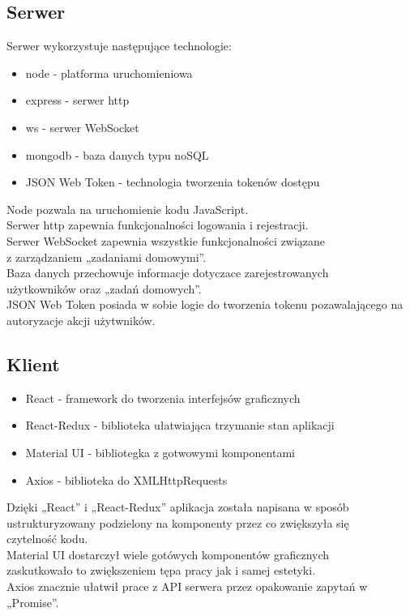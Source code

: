 \documentclass[12pt,a4paper]{article}  %
\begin{document}
		\subsection{Serwer}
		Serwer wykorzystuje następujące technologie:
		\begin{itemize}  
			\item node - platforma uruchomieniowa
			\item express - serwer http
			\item ws - serwer WebSocket
			\item mongodb - baza danych typu noSQL
			\item JSON Web Token - technologia tworzenia tokenów dostępu
		\end{itemize}
		Node pozwala na uruchomienie kodu JavaScript. \\
		Serwer http zapewnia funkcjonalności logowania i rejestracji.\\
		Serwer WebSocket zapewnia wszystkie funkcjonalności związane \\ z zarządzaniem „zadaniami domowymi”. \\
		Baza danych przechowuje informacje dotyczace zarejestrowanych\\ użytkowników oraz „zadań domowych”. \\
		JSON Web Token posiada w sobie logie do tworzenia tokenu pozawalającego na autoryzacje akcji użytwników. \\
		\newpage
		\subsection{Klient}
		\begin{itemize}  
			\item React - framework do tworzenia interfejsów graficznych
			\item React-Redux - biblioteka ułatwiająca trzymanie stan aplikacji
			\item Material UI - bibliotegka z gotwowymi komponentami
			\item Axios - biblioteka do XMLHttpRequests
		\end{itemize}
		Dzięki „React” i „React-Redux” aplikacja została napisana w sposób\\ ustrukturyzowany podzielony na komponenty przez co zwiększyła się\\ czytelność kodu. \\
		Material UI dostarczył wiele gotówych komponentów graficznych\\ zaskutkowało to zwiększeniem tępa pracy jak i samej estetyki. \\
		Axios znacznie ułatwił prace z API serwera przez opakowanie zapytań w „Promise”.
\end{document}
